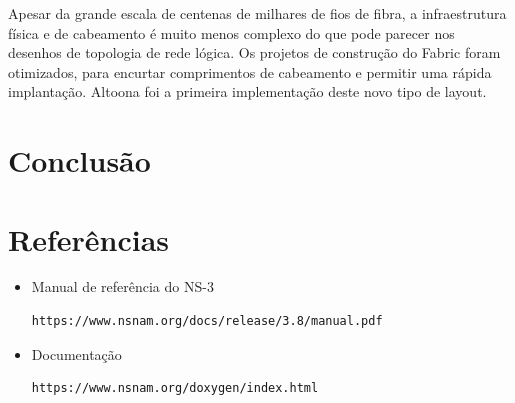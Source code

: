 \documentclass[12pt,a4paper]{report}
\begin{document}
Apesar da grande escala de centenas de milhares de fios de fibra, a infraestrutura física 
e de cabeamento é muito menos complexo do que pode parecer nos desenhos de topologia de rede lógica. 
Os projetos de construção do Fabric foram otimizados, para encurtar comprimentos de cabeamento 
e permitir uma rápida implantação. Altoona foi a primeira implementação deste novo tipo de layout.




\chapter{Conclusão}

\chapter{Referências}

\begin{itemize}
\item Manual de referência do NS-3 \begin{verbatim}https://www.nsnam.org/docs/release/3.8/manual.pdf\end{verbatim}
\item Documentação \begin{verbatim}https://www.nsnam.org/doxygen/index.html\end{verbatim}
\end{itemize}
\end{document}
